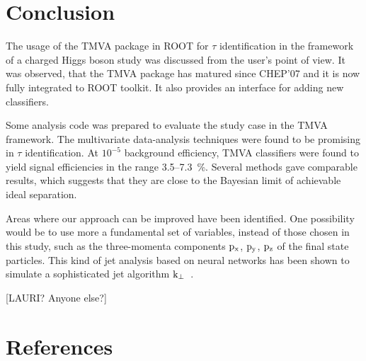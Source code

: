 \documentclass[a4paper]{jpconf}
\begin{document}
\section{Conclusion}
The usage of the TMVA package in ROOT for $\tau$ identification in the
framework of a charged Higgs boson study was discussed from the  user's point of view. 
It was observed, that the TMVA package has
matured since CHEP'07 and it is now fully integrated to ROOT toolkit. 
It also provides an interface for adding new classifiers.

Some analysis code was prepared to evaluate the study case in the TMVA
framework. The multivariate data-analysis techniques were found to
be promising in $\tau$ identification.
At $10^{-5}$ background efficiency, 
TMVA classifiers were found to yield signal efficiencies in the range 3.5--7.3~\%.
Several methods gave comparable results, 
which suggests that they are close to the Bayesian limit of achievable ideal separation.

Areas where our approach can be improved have been identified.
One possibility would be to use more a fundamental set of variables, 
instead of those chosen in this study, 
such as the three-momenta components ${\rm p_x}$, ${\rm p_y}$, ${\rm p_z}$ of the final state particles. 
This kind of jet analysis based on neural networks has been shown to simulate a sophisticated 
jet algorithm ${\rm k_\bot}$~\cite{jetanalysis}.

\ack %
[LAURI? Anyone else?]

\section*{References}
\end{document}
